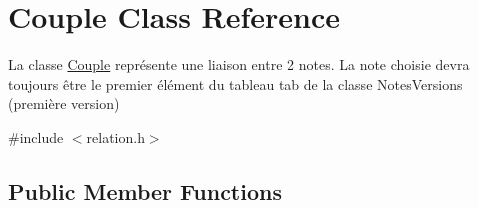 \hypertarget{classCouple}{}\section{Couple Class Reference}
\label{classCouple}


La classe \hyperlink{classCouple}{Couple} représente une liaison entre 2 notes. La note choisie devra toujours être le premier élément du tableau tab de la classe Notes\+Versions (première version)  




{\ttfamily \#include $<$relation.\+h$>$}

\subsection*{Public Member Functions}
